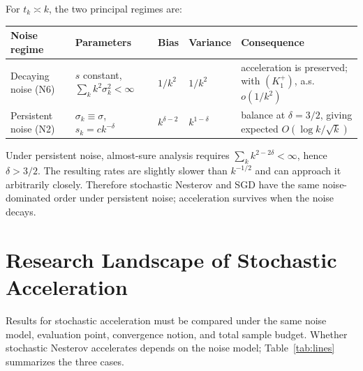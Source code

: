 \documentclass[11pt]{article}
\begin{document}
For $t_k\asymp k$, the two principal regimes are:
\begin{center}
\small
\begin{tabularx}{\linewidth}{@{}lYllY@{}}
\toprule
Noise regime & Parameters & Bias & Variance & Consequence \\
\midrule
Decaying noise (N6) & $s$ constant, $\sum_k k^2\sigma_k^2<\infty$ & $1/k^2$ & $1/k^2$ & acceleration is preserved; with $(K_1^+)$, a.s.\ $o(1/k^2)$ \\
Persistent noise (N2) & $\sigma_k\equiv\sigma$, $s_k=c k^{-\delta}$ & $k^{\delta-2}$ & $k^{1-\delta}$ & balance at $\delta=3/2$, giving expected $O(\log k/\sqrt{k})$ \\
\bottomrule
\end{tabularx}
\end{center}

Under persistent noise, almost-sure analysis requires
$\sum_k k^{2-2\delta}<\infty$, hence $\delta>3/2$. The resulting rates are slightly slower than $k^{-1/2}$ and can approach it arbitrarily closely. Therefore stochastic Nesterov and SGD have the same noise-dominated order under persistent noise; acceleration survives when the noise decays.

\section{Research Landscape of Stochastic Acceleration}

Results for stochastic acceleration must be compared under the same noise model, evaluation point, convergence notion, and total sample budget. Whether stochastic Nesterov accelerates depends on the noise model; Table~\ref{tab:lines} summarizes the three cases.
\end{document}
